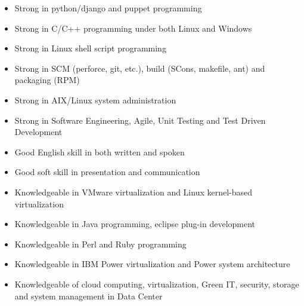 \documentclass[10pt,letterpaper]{article}
\begin{document}
\spacedhrule{0.5em}{-0.4em} %


{
    \begin{itemize}
        \item Strong in python/django and puppet programming

        \item Strong in C/C++ programming under both Linux and Windows

        \item Strong in Linux shell script programming

        \item Strong in SCM (perforce, git, etc.), build (SCons, makefile, ant)
            and packaging (RPM)

        \item Strong in AIX/Linux system administration

        \item Strong in Software Engineering, Agile, Unit Testing and Test
            Driven Development

        \item Good English skill in both written and spoken

        \item Good soft skill in presentation and communication

        \item Knowledgeable in VMware virtualization and Linux kernel-based
            virtualization

        \item Knowledgeable in Java programming, eclipse plug-in development

        \item Knowledgeable in Perl and Ruby programming

        \item Knowledgeable in IBM Power virtualization and Power system
            architecture

        \item Knowledgeable of cloud computing, virtualization, Green IT,
            security, storage and system management in Data Center
    \end{itemize}
}
\end{document}

